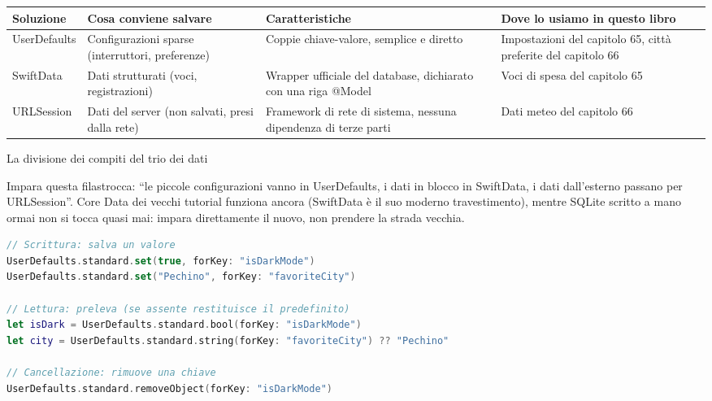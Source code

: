 


\begin{center}
\begin{tabularx}{\linewidth}{|X|X|X|X|}
\hline
\textbf{Soluzione} & \textbf{Cosa conviene salvare} & \textbf{Caratteristiche} & \textbf{Dove lo usiamo in questo libro} \tabularnewline
\hline
UserDefaults & Configurazioni sparse (interruttori, preferenze) & Coppie chiave-valore, semplice e diretto & Impostazioni del capitolo 65, città preferite del capitolo 66 \tabularnewline
SwiftData & Dati strutturati (voci, registrazioni) & Wrapper ufficiale del database, dichiarato con una riga @Model & Voci di spesa del capitolo 65 \tabularnewline
URLSession & Dati del server (non salvati, presi dalla rete) & Framework di rete di sistema, nessuna dipendenza di terze parti & Dati meteo del capitolo 66 \tabularnewline
\hline
\end{tabularx}
\end{center}

\begin{center}\small\color{gray}La divisione dei compiti del trio dei dati\end{center}

Impara questa filastrocca: “le piccole configurazioni vanno in UserDefaults, i dati in blocco in SwiftData, i dati dall'esterno passano per URLSession”. Core Data dei vecchi tutorial funziona ancora (SwiftData è il suo moderno travestimento), mentre SQLite scritto a mano ormai non si tocca quasi mai: impara direttamente il nuovo, non prendere la strada vecchia.


\begin{lstlisting}[language=Swift]
// Scrittura: salva un valore
UserDefaults.standard.set(true, forKey: "isDarkMode")
UserDefaults.standard.set("Pechino", forKey: "favoriteCity")

// Lettura: preleva (se assente restituisce il predefinito)
let isDark = UserDefaults.standard.bool(forKey: "isDarkMode")
let city = UserDefaults.standard.string(forKey: "favoriteCity") ?? "Pechino"

// Cancellazione: rimuove una chiave
UserDefaults.standard.removeObject(forKey: "isDarkMode")
\end{lstlisting}

